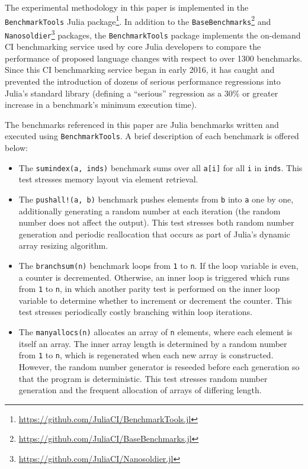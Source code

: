 \documentclass[conference]{IEEEtran}
\begin{document}
The experimental methodology in this paper is implemented in the
\lstinline|BenchmarkTools| Julia
package\footnote{\url{https://github.com/JuliaCI/BenchmarkTools.jl}}. In
addition to the
\lstinline|BaseBenchmarks|\footnote{\url{https://github.com/JuliaCI/BaseBenchmarks.jl}}
and
\lstinline|Nanosoldier|\footnote{\url{https://github.com/JuliaCI/Nanosoldier.jl}}
packages, the \lstinline|BenchmarkTools| package implements the on-demand CI
benchmarking service used by core Julia developers to compare the performance
of proposed language changes with respect to over 1300 benchmarks. Since this
CI benchmarking service began in early 2016, it has caught and prevented the
introduction of dozens of serious performance regressions into Julia's standard
library (defining a ``serious'' regression as a $30\%$ or greater increase in a
benchmark's minimum execution time).

The benchmarks referenced in this paper are Julia benchmarks written and
executed using \lstinline|BenchmarkTools|. A brief description of each
benchmark is offered below:

\begin{itemize}
    \item The \lstinline|sumindex(a, inds)| benchmark sums over all
\lstinline|a[i]| for all \lstinline|i| in \lstinline|inds|. This test stresses
memory layout via element retrieval.
    \item The \lstinline|pushall!(a, b)| benchmark pushes elements from \lstinline|b| into
    \lstinline|a| one by one, additionally generating a random number at each iteration (the
    random number does not affect the output). This test stresses both random number
    generation and periodic reallocation that occurs as part of Julia's dynamic array
    resizing algorithm.
    \item The \lstinline|branchsum(n)| benchmark loops from \lstinline|1| to \lstinline|n|.
    If the loop variable is even, a counter is decremented. Otherwise, an inner loop is
    triggered which runs from \lstinline|1| to \lstinline|n|, in which another parity test
    is performed on the inner loop variable to determine whether to increment or decrement
    the counter. This test stresses periodically costly branching within loop iterations.
    \item The \lstinline|manyallocs(n)| allocates an array of \lstinline|n| elements, where
    each element is itself an array. The inner array length is determined by a random number
    from \lstinline|1| to \lstinline|n|, which is regenerated when each new array is
    constructed. However, the random number generator is reseeded before each generation so
    that the program is deterministic. This test stresses random number generation and
    the frequent allocation of arrays of differing length.
\end{itemize}
\end{document}
